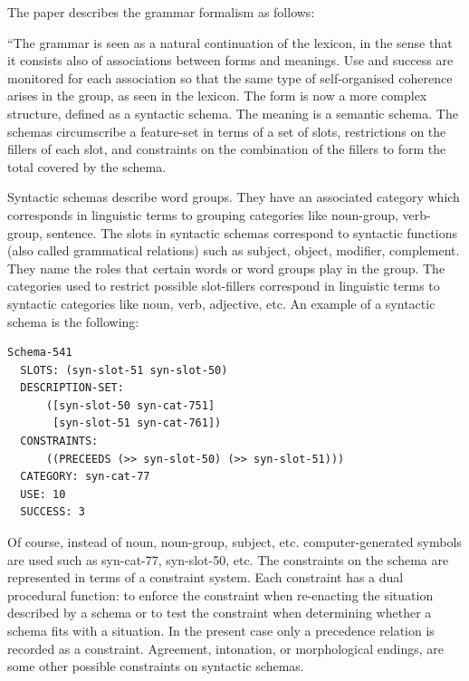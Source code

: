 The paper describes the grammar formalism as follows:

``The grammar is seen as a natural continuation of the lexicon, in the sense that it consists also of associations between forms and meanings. Use and success are monitored for each association so that the same type of self-organised coherence arises in the group, as seen in the lexicon. The form is now a more complex structure, defined as a syntactic schema. The meaning is a semantic schema. The schemas
circumscribe a feature-set in terms of a set of slots, restrictions	
on the fillers of each slot, and constraints on the combination	
of the fillers to form the total covered by the schema. 

Syntactic schemas describe word groups. They have an associated category which corresponds in linguistic terms to grouping categories like noun-group, verb-group, sentence. The slots in syntactic schemas correspond to syntactic functions (also called grammatical relations) such as subject, object, modifier, complement. They name the roles that certain words or word groups play in the group. The categories used to restrict possible slot-fillers correspond in linguistic terms to syntactic categories like noun, verb, adjective, etc. An example of a syntactic schema is the following:
\begin{verbatim}
Schema-541 
  SLOTS: (syn-slot-51 syn-slot-50) 
  DESCRIPTION-SET: 
      ([syn-slot-50 syn-cat-751] 
       [syn-slot-51 syn-cat-761])
  CONSTRAINTS:
      ((PRECEEDS (>> syn-slot-50) (>> syn-slot-51)))
  CATEGORY: syn-cat-77 
  USE: 10 
  SUCCESS: 3
\end{verbatim}
Of course, instead of noun, noun-group, subject, etc. computer-generated symbols are used such 
as syn-cat-77, syn-slot-50, etc. The constraints on the schema are represented in terms of
a constraint system. Each constraint
has a dual procedural function: to enforce the constraint when re-enacting the situation
described by a schema or to test the constraint when determining whether a schema fits with a situation. In the present
case only a precedence relation is recorded as a constraint. Agreement, intonation, or morphological
endings, are some other possible constraints on syntactic schemas.

